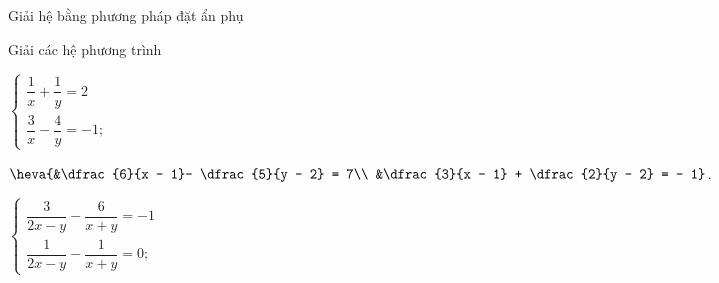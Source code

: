 \begin{dang}{Giải hệ bằng phương pháp đặt ẩn phụ}
\end{dang}
\begin{vd}%
	Giải các hệ phương trình
	\begin{enumEX}{3}
	\item $\begin{cases}
	{\dfrac{1}{x} + \dfrac{1}{y}= 2}\\
	{\dfrac{3}{x} - \dfrac{4}{y}= - 1;}
	\end{cases}$
	\item $\heva{&\dfrac{6}{x - 1}- \dfrac{5}{y - 2} = 7\\ &\dfrac{3}{x - 1} + \dfrac{2}{y - 2} = - 1}$.
	\item $\begin{cases}
	{\dfrac{3}{2x - y} - \dfrac{6}{x + y}= - 1}\\
	{\dfrac{1}{2x - y} - \dfrac{1}{x + y}= 0;}
	\end{cases}$
	\end{enumEX}
\end{vd}

